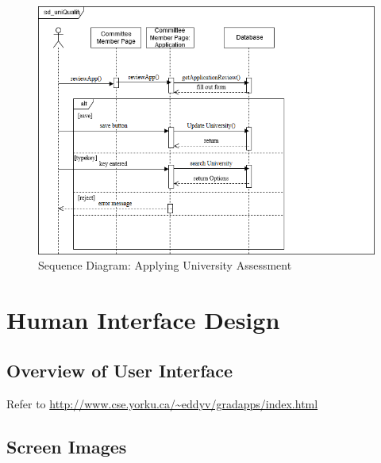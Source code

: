 \documentclass[fontsize=12pt,paper=letter,twoside]{scrartcl}
\begin{document}
\begin{figure}[!htb]
\begin{center}
\includegraphics[width=.99\textwidth]{images/sd_uniQuality.png}
\end{center}
\caption{Sequence Diagram: Applying University Assessment}
\label{fig:sd_apply_uni}
\end{figure}



\clearpage
\newpage
\section{Human Interface Design}

\subsection{Overview of User Interface}

Refer to \url{http://www.cse.yorku.ca/~eddyv/gradapps/index.html}

\subsection{Screen Images}
\end{document}
